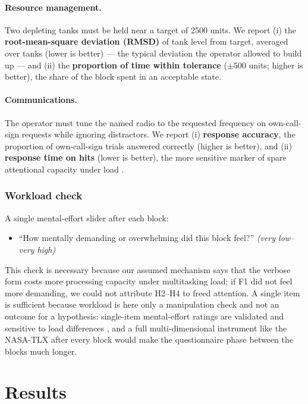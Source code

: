 \documentclass[10pt,twocolumn]{article}
\begin{document}
\paragraph{Resource management.} Two depleting tanks must be held near a target of 2500 units. We report (i) the \textbf{root-mean-square deviation (RMSD)} of tank level from target, averaged over tanks (lower is better) --- the typical deviation the operator allowed to build up --- and (ii) the \textbf{proportion of time within tolerance} ($\pm 500$ units; higher is better), the share of the block spent in an acceptable state.

\paragraph{Communications.} The operator must tune the named radio to the requested frequency on own-call-sign requests while ignoring distractors. We report (i) \textbf{response accuracy}, the proportion of own-call-sign trials answered correctly (higher is better), and (ii) \textbf{response time on hits} (lower is better), the more sensitive marker of spare attentional capacity under load \parencite{Cegarra2020}.

\subsubsection{Workload check}
A single mental-effort slider after each block:
\begin{itemize}
  \item ``How mentally demanding or overwhelming did this block feel?'' \textit{(very low--very high)}
\end{itemize}
This check is necessary because our assumed mechanism says that the verbose form costs more processing capacity under multitasking load; if F1 did not feel more demanding, we could not attribute H2--H4 to freed attention. A single item is sufficient because workload is here only a manipulation check and not an outcome for a hypothesis: single-item mental-effort ratings are validated and sensitive to load differences \parencite{Paas1992}, and a full multi-dimensional instrument like the NASA-TLX after every block would make the questionnaire phase between the blocks much longer.

\section{Results}
\end{document}
